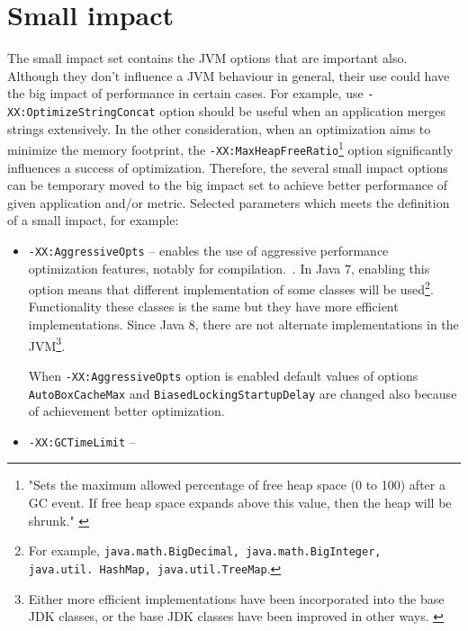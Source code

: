 \documentclass[
  digital, %
  oneside,
  notable, %
  nolof,     %
  nolot     %
]{fithesis3}
\begin{document}
\section{Small impact}
The small impact set contains the JVM options that are important also. Although they don't influence a JVM behaviour in general, their use could have the big impact of performance in certain cases. For example, use \texttt{-XX:OptimizeStringConcat} option should be useful when an application merges strings extensively. In the other consideration, when an optimization aims to minimize the memory footprint, the \texttt{-XX:MaxHeapFreeRatio}\footnote{"Sets the maximum allowed percentage of free heap space (0 to 100) after a GC event. If free heap space expands above this value, then the heap will be shrunk." \cite{java}} option significantly influences a success of optimization.
Therefore, the several small impact options can be temporary moved to the big impact set to achieve better performance of given application and/or metric.
Selected parameters which meets the definition of a small impact, for example:
\begin{itemize}
	\item \texttt{-XX:AggressiveOpts} -- enables the use of aggressive performance optimization features, notably for compilation.~\cite{java}. In Java 7, enabling this option means that different implementation of some classes will be used\footnote{For example, \texttt{java.math.BigDecimal, java.math.BigInteger, java.util.\ HashMap, java.util.TreeMap}.}. Functionality these classes is the same but they have more efficient implementations. Since Java 8, there are not alternate implementations in the JVM\footnote{Either more efficient implementations have been incorporated into the base JDK classes, or the base JDK classes have been improved in other ways. \cite{scott}}.
	
	When \texttt{-XX:AggressiveOpts} option is enabled default values of options \texttt{AutoBoxCacheMax} and \texttt{BiasedLockingStartupDelay} are changed also because of achievement better optimization.
	\item \texttt{-XX:GCTimeLimit} -- 
	
\end{itemize}
\end{document}
